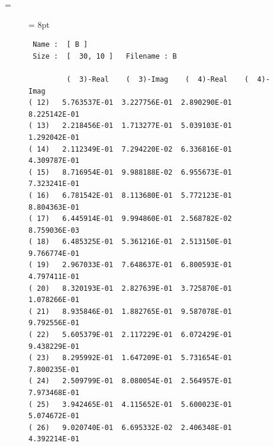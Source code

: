 \documentclass{jbook}
\makeatletter
\let\realnormalsize=\normalsize
\def\preveqno{}\let\real@float=\@float \let\realend@float=\end@float
\def\@float{\let\@savefreelist\@freelist\real@float}
\def\end@float{\realend@float\global\let\@freelist\@savefreelist}
\def\adjustnormalsize{\def\normalsize{\mathsurround=0pt \realnormalsize
 \parindent=0pt\abovedisplayskip=0pt\belowdisplayskip=0pt}\normalsize}%
\def\lthtmltypeout#1{{\let\protect\string\immediate\write\lthtmlwrite{#1}}}%
\newcommand\lthtmlvboxmathA{\adjustnormalsize\setbox\sizebox=\vbox\bgroup%
 \let\ifinner=\iffalse }%
\newcommand\lthtmlboxmathZ{\@next\next\@currlist{}{\def\next{\voidb@x}}%
 \expandafter\box\next\egroup}%
\newcommand\lthtmlmathtype[1]{\def\lthtmlmathenv{#1}}%
\newcommand\lthtmllogmath{\lthtmltypeout{l2hSize %
:\lthtmlmathenv:\the\ht\sizebox::\the\dp\sizebox::\the\wd\sizebox.\preveqno}}%
\newcommand\lthtmlfigureA[1]{\let\@savefreelist\@freelist
       \lthtmlmathtype{#1}\lthtmlvboxmathA}%
\newcommand\lthtmlfigureZ{\lthtmlboxmathZ\lthtmllogmath\copy\sizebox
       \global\let\@freelist\@savefreelist}%
\def\lthtmlcheckvsize{\ifdim\ht\sizebox<\vsize\expandafter\vfill
  \else\expandafter\vss\fi}%
\makeatother
\begin{document}
{\newpage\clearpage
\lthtmlfigureA{figure3428}%
\begin{figure}
\begin{center}\htmlrule\small
{\baselineskip = 8pt
\begin{tex2html_preform}\begin{verbatim} Name :  [ B ]
 Size :  [  30, 10 ]   Filename : B

         (  3)-Real    (  3)-Imag    (  4)-Real    (  4)-Imag
( 12)   5.763537E-01  3.227756E-01  2.890290E-01  8.225142E-01
( 13)   2.218456E-01  1.713277E-01  5.039103E-01  1.292042E-01
( 14)   2.112349E-01  7.294220E-02  6.336816E-01  4.309787E-01
( 15)   8.716954E-01  9.988188E-02  6.955673E-01  7.323241E-01
( 16)   6.781542E-01  8.113680E-01  5.772123E-01  8.804363E-01
( 17)   6.445914E-01  9.994860E-01  2.568782E-02  8.759036E-03
( 18)   6.485325E-01  5.361216E-01  2.513150E-01  9.766774E-01
( 19)   2.967033E-01  7.648637E-01  6.800593E-01  4.797411E-01
( 20)   8.320193E-01  2.827639E-01  3.725870E-01  1.078266E-01
( 21)   8.935846E-01  1.882765E-01  9.587078E-01  9.792556E-01
( 22)   5.605379E-01  2.117229E-01  6.072429E-01  9.438229E-01
( 23)   8.295992E-01  1.647209E-01  5.731654E-01  7.800235E-01
( 24)   2.509799E-01  8.080054E-01  2.564957E-01  7.973468E-01
( 25)   3.942465E-01  4.115652E-01  5.600023E-01  5.074672E-01
( 26)   9.020740E-01  6.695332E-02  2.406348E-01  4.392214E-01\end{verbatim}\end{tex2html_preform}}\htmlrule\end{center}
\vspace{-1em}
\par\end{figure}%
\lthtmlfigureZ
\hfill\lthtmlcheckvsize\clearpage}
\end{document}
